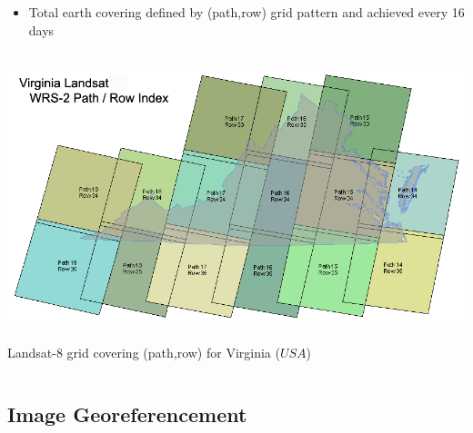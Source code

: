 \documentclass[c]{beamer}
\begin{document}
\begin{frame}

\begin{itemize}
\item Total earth covering defined by (path,row) grid pattern and achieved every 16 days
\end{itemize}
\begin{columns}
\begin{column}{\textwidth}
\begin{overlayarea}{\linewidth}{4cm}
  \centering\vfill
  \includegraphics[scale=0.2]{images/covering/wrs.png}
\end{overlayarea}
\begin{overlayarea}{\linewidth}{1cm}
  \centering
  \tiny Landsat-8 grid covering (path,row) for Virginia ($USA$)\par
\end{overlayarea}
\end{column}
\end{columns}

\end{frame}

\subsection{Image Georeferencement}
\begin{frame}
\tableofcontents[currentsubsection]
\end{frame}
\end{document}
